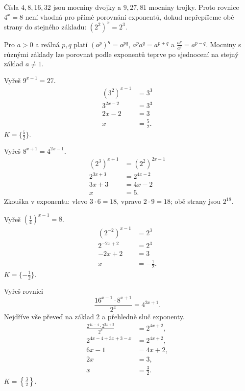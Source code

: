 \documentclass[11pt,a4paper]{article}
\begin{document}
Čísla $4,8,16,32$ jsou mocniny dvojky a $9,27,81$ mocniny trojky. Proto rovnice $4^x=8$ není vhodná pro přímé porovnání exponentů, dokud nepřepíšeme obě strany do stejného základu: $(2^2)^x=2^3$.
\begin{zadaniBox}[title={Věta - Pravidla pro mocniny}]
Pro $a>0$ a reálná $p,q$ platí $(a^p)^q=a^{pq}$, $a^pa^q=a^{p+q}$ a $\frac{a^p}{a^q}=a^{p-q}$. Mocniny s různými základy lze porovnat podle exponentů teprve po sjednocení na stejný základ $a\ne1$.
\end{zadaniBox}
\begin{prikladReseniBox}[title={Příklad 1}]
Vyřeš $9^{x-1}=27$.
\tcblower
\[\begin{aligned}(3^2)^{x-1}&=3^3\\3^{2x-2}&=3^3\\2x-2&=3\\x&=\frac{5}{2}.\end{aligned}\]
$K=\{\frac{5}{2}\}$.
\end{prikladReseniBox}
\begin{prikladReseniBox}[title={Příklad 2}]
Vyřeš $8^{x+1}=4^{2x-1}$.
\tcblower
\[\begin{aligned}(2^3)^{x+1}&=(2^2)^{2x-1}\\2^{3x+3}&=2^{4x-2}\\3x+3&=4x-2\\x&=5.\end{aligned}\]
Zkouška v exponentu: vlevo $3\cdot6=18$, vpravo $2\cdot9=18$; obě strany jsou $2^{18}$.
\end{prikladReseniBox}
\begin{prikladReseniBox}[title={Příklad 3}]
Vyřeš $\left(\frac{1}{4}\right)^{x-1}=8$.
\tcblower
\[\begin{aligned}(2^{-2})^{x-1}&=2^3\\2^{-2x+2}&=2^3\\-2x+2&=3\\x&=-\frac{1}{2}.\end{aligned}\]
$K=\{-\frac{1}{2}\}$.
\end{prikladReseniBox}
\begin{prikladReseniBox}[title={Příklad 4}]
Vyřeš rovnici
\[
\frac{16^{x-1}\cdot8^{x+1}}{2^x}=4^{2x+1}.
\]
Nejdříve vše převeď na základ 2 a přehledně sluč exponenty.
\tcblower
\[
\begin{aligned}
\frac{2^{4x-4}\cdot2^{3x+3}}{2^x}&=2^{4x+2},\\
2^{4x-4+3x+3-x}&=2^{4x+2},\\
6x-1&=4x+2,\\
2x&=3,\\
x&=\frac{3}{2}.
\end{aligned}
\]
$K=\left\{\frac{3}{2}\right\}$.
\end{prikladReseniBox}
\end{document}
